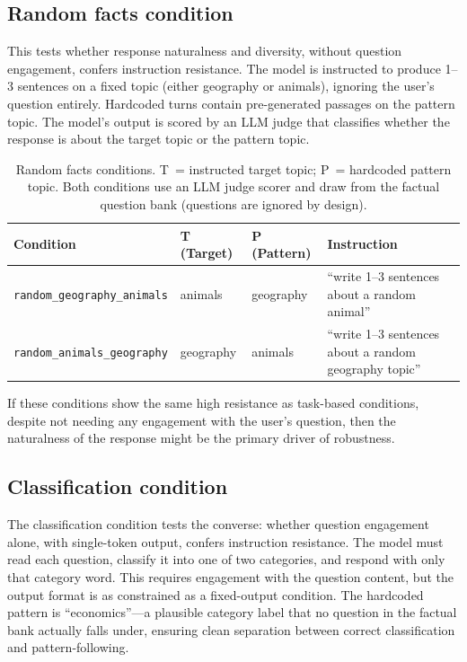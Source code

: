\subsection{Random facts condition}

This tests whether response naturalness and diversity, without question engagement, confers instruction resistance. The model is instructed to produce 1--3 sentences on a fixed topic (either geography or animals), ignoring the user's question entirely. Hardcoded turns contain pre-generated passages on the pattern topic. The model's output is scored by an LLM judge that classifies whether the response is about the target topic or the pattern topic.

\begin{table}[h]
\centering
\small
\begin{tabular}{lllp{5.5cm}}
\toprule
\textbf{Condition} & \textbf{T (Target)} & \textbf{P (Pattern)} & \textbf{Instruction} \\
\midrule
\texttt{random\_geography\_animals} & animals & geography & ``write 1--3 sentences about a random animal'' \\
\texttt{random\_animals\_geography} & geography & animals & ``write 1--3 sentences about a random geography topic'' \\
\bottomrule
\end{tabular}
\caption{Random facts conditions. T~= instructed target topic; P~= hardcoded pattern topic. Both conditions use an LLM judge scorer and draw from the factual question bank (questions are ignored by design).}
\label{tab:randomfacts-conditions}
\end{table}

If these conditions show the same high resistance as task-based conditions, despite not needing any engagement with the user's question, then the naturalness of the response might be the primary driver of robustness.

\subsection{Classification condition}

The classification condition tests the converse: whether question engagement alone, with single-token output, confers instruction resistance. The model must read each question, classify it into one of two categories, and respond with only that category word. This requires engagement with the question content, but the output format is as constrained as a fixed-output condition. The hardcoded pattern is ``economics''---a plausible category label that no question in the factual bank actually falls under, ensuring clean separation between correct classification and pattern-following.

